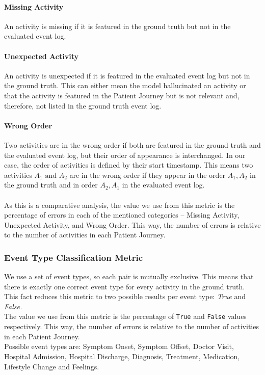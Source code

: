 \paragraph{Missing Activity} An activity is missing if it is featured in the ground truth but not in the evaluated event log. 
\paragraph{Unexpected Activity} An activity is unexpected if it is featured in the evaluated event log but not in the ground truth. This can either mean the model hallucinated an activity or that the activity is featured in the Patient Journey but is not relevant and, therefore, not listed in the ground truth event log.
\paragraph{Wrong Order} Two activities are in the wrong order if both are featured in the ground truth and the evaluated event log, but their order of appearance is interchanged. In our case, the order of activities is defined by their start timestamp. This means two activities $A_1 \text{ and } A_2$ are in the wrong order if they appear in the order $A_1,A_2$ in the ground truth and in order $A_2, A_1$ in the evaluated event log.\\\\
As this is a comparative analysis, the value we use from this metric is the percentage of errors in each of the mentioned categories – Missing Activity, Unexpected Activity, and Wrong Order. This way, the number of errors is relative to the number of activities in each Patient Journey.

\subsubsection{Event Type Classification Metric}\label{sec:eventtype_metric}
We use a set of event types, so each pair is mutually exclusive. This means that there is exactly one correct event type for every activity in the ground truth. This fact reduces this metric to two possible results per event type: \emph{True} and \emph{False.}\\
The value we use from this metric is the percentage of \verb|True| and \verb|False| values respectively. This way, the number of errors is relative to the number of activities in each Patient Journey.\\
Possible event types are: Symptom Onset, Symptom Offset, Doctor Visit, Hospital Admission, Hospital Discharge, Diagnosis, Treatment, Medication, Lifestyle Change and Feelings.

